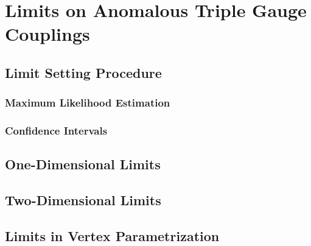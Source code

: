 \chapter{Limits on Anomalous Triple Gauge Couplings}
\label{chap::LimitsonAnomalousTripleGaugeCouplings}

\section{Limit Setting Procedure}
\subsection{Maximum Likelihood Estimation}
\subsection{Confidence Intervals}
\section{One-Dimensional Limits}
\section{Two-Dimensional Limits}
\section{Limits in Vertex Parametrization}